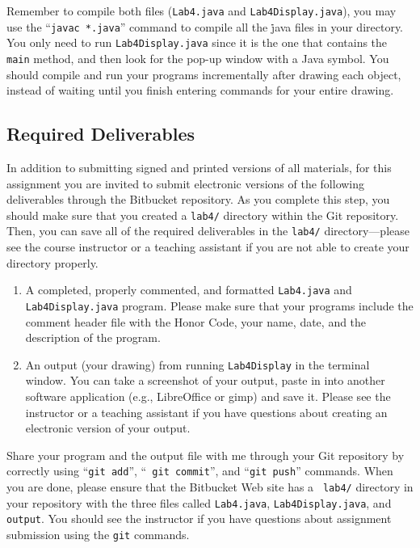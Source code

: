 \begin{sloppypar}
Remember to compile both files ({\tt Lab4.java} and {\tt Lab4Display.java}), you may use the ``{\tt javac *.java}''
command to compile all the {\.java} files in your directory. You only need to run {\tt Lab4Display.java} since it is the
one that contains the {\tt main} method, and then look for the pop-up window with a Java symbol. You should compile and run
your programs incrementally after drawing each object, instead of waiting until you finish entering commands for your
entire drawing. 
\end{sloppypar}

\subsection*{Required Deliverables}

In addition to submitting signed and printed versions of all materials, for this assignment you are invited to submit
electronic versions of the following deliverables through the Bitbucket repository. As you complete this step, you
should make sure that you created a {\tt lab4/} directory within the Git repository.  Then, you can save all of the
required deliverables in the {\tt lab4/} directory---please see the course instructor or a teaching assistant if you are
not able to create your directory properly. 

\begin{enumerate}

        \item A completed, properly commented, and formatted {\tt Lab4.java} and {\tt Lab4Display.java} program. Please
          make sure that your programs  include the comment header file with the Honor Code, your name, date, and the
          description of the program.

        \item An output (your drawing) from running {\tt Lab4Display} in the terminal window. You can take a screenshot
          of your output, paste in into another software application (e.g., LibreOffice or gimp) and save it. Please see
          the instructor or a teaching assistant if you have questions about creating an electronic version of your
          output.

\end{enumerate}

\vspace{-0.1in}

Share your program and the output file with me through your Git repository by correctly using ``{\tt git add}'', ``{\tt
git commit}'', and ``{\tt git push}'' commands. When you are done, please ensure that the Bitbucket Web site has a {\tt
lab4/} directory in your repository with the three files called {\tt Lab4.java}, {\tt Lab4Display.java}, and {\tt
output}. You should see the instructor if you have questions about assignment submission using the {\tt git} commands.





